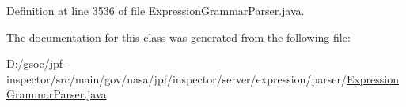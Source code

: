 Definition at line 3536 of file Expression\+Grammar\+Parser.\+java.



The documentation for this class was generated from the following file\+:\begin{DoxyCompactItemize}
\item 
D\+:/gsoc/jpf-\/inspector/src/main/gov/nasa/jpf/inspector/server/expression/parser/\hyperlink{_expression_grammar_parser_8java}{Expression\+Grammar\+Parser.\+java}\end{DoxyCompactItemize}
